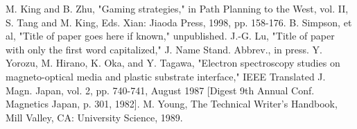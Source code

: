 \documentclass[conference,letterpaper]{IEEEtran}
\begin{document}

\begin{thebibliography}{1}
M. King and B. Zhu, "Gaming strategies," in Path Planning to the West, vol. II, S. Tang and M. King, Eds. Xian: Jiaoda Press, 1998, pp. 158-176.
B. Simpson, et al, "Title of paper goes here if known," unpublished.
J.-G. Lu, "Title of paper with only the first word capitalized," J. Name Stand. Abbrev., in press.
Y. Yorozu, M. Hirano, K. Oka, and Y. Tagawa, "Electron spectroscopy studies on magneto-optical media and plastic substrate interface," IEEE Translated J. Magn. Japan, vol. 2, pp. 740-741, August 1987 [Digest 9th Annual Conf. Magnetics Japan, p. 301, 1982].
M. Young, The Technical Writer's Handbook, Mill Valley, CA: University Science, 1989.
\end{thebibliography}
\end{document}
